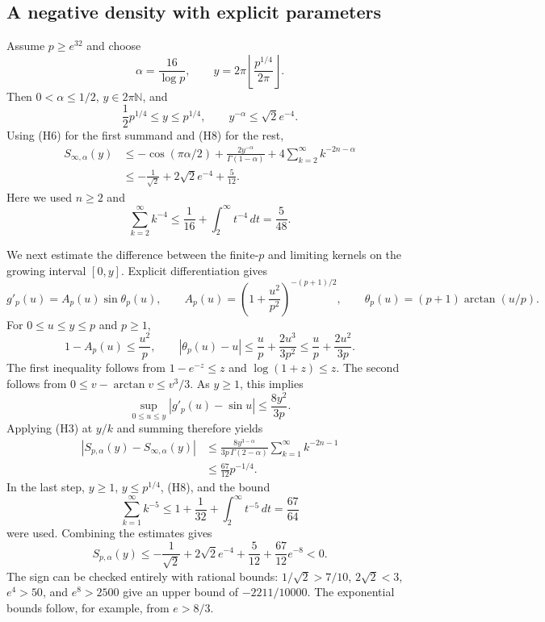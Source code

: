 \documentclass[11pt,a4paper]{article}
\theoremstyle{remark}
\begin{document}
\subsection{A negative density with explicit parameters}

Assume $p\geq e^{32}$ and choose
\[
 \alpha=\frac{16}{\log p},\qquad
 y=2\pi\left\lfloor\frac{p^{1/4}}{2\pi}\right\rfloor.
\tag{H9}
\]
Then $0<\alpha\leq1/2$, $y\in2\pi\mathbb N$, and
\[
 \frac12p^{1/4}\leq y\leq p^{1/4},\qquad
 y^{-\alpha}\leq\sqrt2e^{-4}.
\]
Using (H6) for the first summand and (H8) for the rest,
\begin{align*}
 S_{\infty,\alpha}(y)
 &\leq-\cos(\pi\alpha/2)
       +\frac{2y^{-\alpha}}{\Gamma(1-\alpha)}
       +4\sum_{k=2}^\infty k^{-2n-\alpha}\\
 &\leq-\frac1{\sqrt2}+2\sqrt2e^{-4}+\frac5{12}.
\end{align*}
Here we used $n\geq2$ and
\[
 \sum_{k=2}^\infty k^{-4}
 \leq\frac1{16}+\int_2^\infty t^{-4}\,dt=\frac5{48}.
\tag{H10}
\]

We next estimate the difference between the finite-$p$ and limiting
kernels on the growing interval $[0,y]$. Explicit differentiation gives
\[
 g'_p(u)=A_p(u)\sin\theta_p(u),\qquad
 A_p(u)=\left(1+\frac{u^2}{p^2}\right)^{-(p+1)/2},
 \qquad \theta_p(u)=(p+1)\arctan(u/p).
\]
For $0\leq u\leq y\leq p$ and $p\geq1$,
\[
 1-A_p(u)\leq\frac{u^2}{p},\qquad
 |\theta_p(u)-u|
 \leq\frac up+\frac{2u^3}{3p^2}
 \leq\frac up+\frac{2u^2}{3p}.
\]
The first inequality follows from $1-e^{-z}\leq z$ and
$\log(1+z)\leq z$. The second follows from
$0\leq v-\arctan v\leq v^3/3$.
As $y\geq1$, this implies
\[
 \sup_{0\leq u\leq y}|g'_p(u)-\sin u|
 \leq\frac{8y^2}{3p}.
\tag{H11}
\]
Applying (H3) at $y/k$ and summing therefore yields
\begin{align*}
 |S_{p,\alpha}(y)-S_{\infty,\alpha}(y)|
 &\leq\frac{8y^{3-\alpha}}{3p\,\Gamma(2-\alpha)}
         \sum_{k=1}^\infty k^{-2n-1}\\
 &\leq\frac{67}{12}p^{-1/4}.
\tag{H12}
\end{align*}
In the last step, $y\geq1$, $y\leq p^{1/4}$, (H8), and the bound
\[
 \sum_{k=1}^\infty k^{-5}
 \leq1+\frac1{32}+\int_2^\infty t^{-5}\,dt=\frac{67}{64}
\]
were used. Combining the estimates gives
\[
 S_{p,\alpha}(y)
 \leq-\frac1{\sqrt2}+2\sqrt2e^{-4}
       +\frac5{12}+\frac{67}{12}e^{-8}<0.
\tag{H13}
\]
The sign can be checked entirely with rational bounds:
$1/\sqrt2>7/10$, $2\sqrt2<3$, $e^4>50$, and $e^8>2500$
give an upper bound of $-2211/10000$. The exponential bounds follow,
for example, from $e>8/3$.
\end{document}
